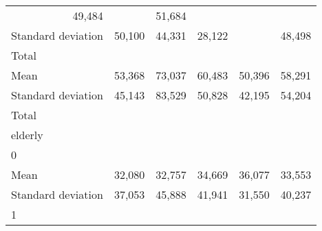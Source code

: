 \begin{tabular}{llllll}
  \multicolumn{1}{r}{49,484} &
  \multicolumn{1}{r}{} &
  \multicolumn{1}{r}{51,684} \\
\multicolumn{1}{l}{\hspace{4em}Standard deviation} &
  \multicolumn{1}{|r}{50,100} &
  \multicolumn{1}{r}{44,331} &
  \multicolumn{1}{r}{28,122} &
  \multicolumn{1}{r}{} &
  \multicolumn{1}{r}{48,498} \\
\multicolumn{1}{l}{\hspace{3em}Total} &
  \multicolumn{1}{|r}{} &
  \multicolumn{1}{r}{} &
  \multicolumn{1}{r}{} &
  \multicolumn{1}{r}{} &
  \multicolumn{1}{r}{} \\
\multicolumn{1}{l}{\hspace{4em}Mean} &
  \multicolumn{1}{|r}{53,368} &
  \multicolumn{1}{r}{73,037} &
  \multicolumn{1}{r}{60,483} &
  \multicolumn{1}{r}{50,396} &
  \multicolumn{1}{r}{58,291} \\
\multicolumn{1}{l}{\hspace{4em}Standard deviation} &
  \multicolumn{1}{|r}{45,143} &
  \multicolumn{1}{r}{83,529} &
  \multicolumn{1}{r}{50,828} &
  \multicolumn{1}{r}{42,195} &
  \multicolumn{1}{r}{54,204} \\
\multicolumn{1}{l}{\hspace{1em}Total} &
  \multicolumn{1}{|r}{} &
  \multicolumn{1}{r}{} &
  \multicolumn{1}{r}{} &
  \multicolumn{1}{r}{} &
  \multicolumn{1}{r}{} \\
\multicolumn{1}{l}{\hspace{2em}elderly} &
  \multicolumn{1}{|r}{} &
  \multicolumn{1}{r}{} &
  \multicolumn{1}{r}{} &
  \multicolumn{1}{r}{} &
  \multicolumn{1}{r}{} \\
\multicolumn{1}{l}{\hspace{3em}0} &
  \multicolumn{1}{|r}{} &
  \multicolumn{1}{r}{} &
  \multicolumn{1}{r}{} &
  \multicolumn{1}{r}{} &
  \multicolumn{1}{r}{} \\
\multicolumn{1}{l}{\hspace{4em}Mean} &
  \multicolumn{1}{|r}{32,080} &
  \multicolumn{1}{r}{32,757} &
  \multicolumn{1}{r}{34,669} &
  \multicolumn{1}{r}{36,077} &
  \multicolumn{1}{r}{33,553} \\
\multicolumn{1}{l}{\hspace{4em}Standard deviation} &
  \multicolumn{1}{|r}{37,053} &
  \multicolumn{1}{r}{45,888} &
  \multicolumn{1}{r}{41,941} &
  \multicolumn{1}{r}{31,550} &
  \multicolumn{1}{r}{40,237} \\
\multicolumn{1}{l}{\hspace{3em}1} &

\end{tabular}

